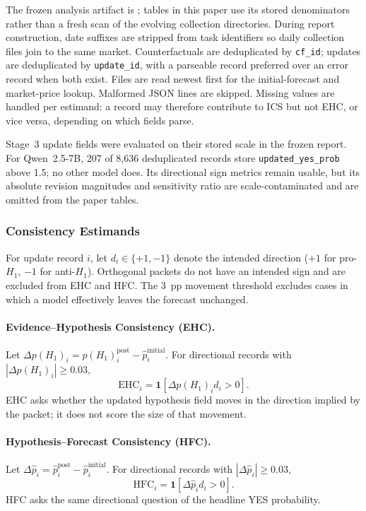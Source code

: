The frozen analysis artifact is
; tables in
this paper use its stored denominators rather than a fresh scan of the evolving
collection directories.  During report construction, date suffixes are stripped from
task identifiers so daily collection files join to the same market.  Counterfactuals
are deduplicated by \texttt{cf\_id}; updates are deduplicated by
\texttt{update\_id}, with a parseable record preferred over an error record when both
exist.  Files are read newest first for the initial-forecast and market-price lookup.
Malformed JSON lines are skipped.  Missing values are handled per estimand: a record
may therefore contribute to ICS but not EHC, or vice versa, depending on which fields
parse.

Stage~3 update fields were evaluated on their stored scale in the frozen report.
For Qwen~2.5-7B, 207 of 8,636 deduplicated records store
\texttt{updated\_yes\_prob} above 1.5; no other model does. Its directional sign
metrics remain usable, but its absolute revision magnitudes and sensitivity
ratio are scale-contaminated and are omitted from the paper tables.

\subsubsection{Consistency Estimands}
\label{app:metric-definitions}

For update record \(i\), let \(d_i\in\{+1,-1\}\) denote the intended direction
(\(+1\) for pro-$H_1$, \(-1\) for anti-$H_1$).  Orthogonal packets do not have an
intended sign and are excluded from EHC and HFC.  The 3~pp movement threshold excludes
cases in which a model effectively leaves the forecast unchanged.

\paragraph{Evidence--Hypothesis Consistency (EHC).}
Let \(\Delta p(H_1)_i=p(H_1)_i^{\mathrm{post}}-\hat p_i^{\mathrm{initial}}\).
For directional records with \(|\Delta p(H_1)_i|\geq0.03\),
\begin{equation}
  \mathrm{EHC}_i=\mathbf{1}\!\left[\Delta p(H_1)_i d_i>0\right].
  \label{eq:ehc}
\end{equation}
EHC asks whether the updated hypothesis field moves in the direction implied by the
packet; it does not score the size of that movement.

\paragraph{Hypothesis--Forecast Consistency (HFC).}
Let \(\Delta\hat p_i=\hat p_i^{\mathrm{post}}-\hat p_i^{\mathrm{initial}}\).
For directional records with \(|\Delta\hat p_i|\geq0.03\),
\begin{equation}
  \mathrm{HFC}_i=\mathbf{1}\!\left[\Delta\hat p_i d_i>0\right].
  \label{eq:hfc}
\end{equation}
HFC asks the same directional question of the headline YES probability.

